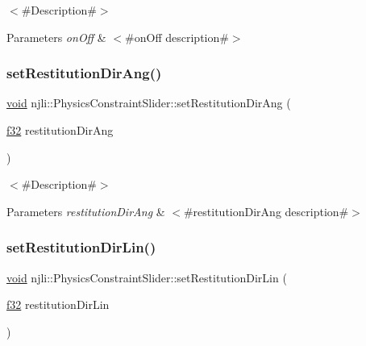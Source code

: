 $<$\#\+Description\#$>$


\begin{DoxyParams}{Parameters}
{\em on\+Off} & $<$\#on\+Off description\#$>$ \\
\hline
\end{DoxyParams}
\mbox{\label{classnjli_1_1_physics_constraint_slider_ad61cced921c56be733113123f8cdc701}} 
\subsubsection{\texorpdfstring{set\+Restitution\+Dir\+Ang()}{setRestitutionDirAng()}}
{\footnotesize\ttfamily \mbox{\hyperlink{_thread_8h_af1e856da2e658414cb2456cb6f7ebc66}{void}} njli\+::\+Physics\+Constraint\+Slider\+::set\+Restitution\+Dir\+Ang (\begin{DoxyParamCaption}\item[{\mbox{\hyperlink{_util_8h_a5f6906312a689f27d70e9d086649d3fd}{f32}}}]{restitution\+Dir\+Ang }\end{DoxyParamCaption})}

$<$\#\+Description\#$>$


\begin{DoxyParams}{Parameters}
{\em restitution\+Dir\+Ang} & $<$\#restitution\+Dir\+Ang description\#$>$ \\
\hline
\end{DoxyParams}
\mbox{\label{classnjli_1_1_physics_constraint_slider_a6d4b746ba8c203158d7cc30a00b138b2}} 
\subsubsection{\texorpdfstring{set\+Restitution\+Dir\+Lin()}{setRestitutionDirLin()}}
{\footnotesize\ttfamily \mbox{\hyperlink{_thread_8h_af1e856da2e658414cb2456cb6f7ebc66}{void}} njli\+::\+Physics\+Constraint\+Slider\+::set\+Restitution\+Dir\+Lin (\begin{DoxyParamCaption}\item[{\mbox{\hyperlink{_util_8h_a5f6906312a689f27d70e9d086649d3fd}{f32}}}]{restitution\+Dir\+Lin }\end{DoxyParamCaption})}

